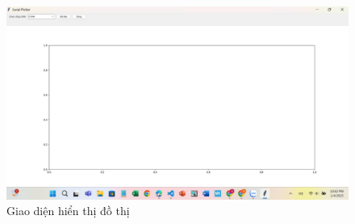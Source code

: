 		\begin{figure}[H]
			\centering
			\includegraphics[width=\linewidth]{./picture/giao dien software.jpg}
			\caption{Giao diện hiển thị đồ thị}
		\end{figure}